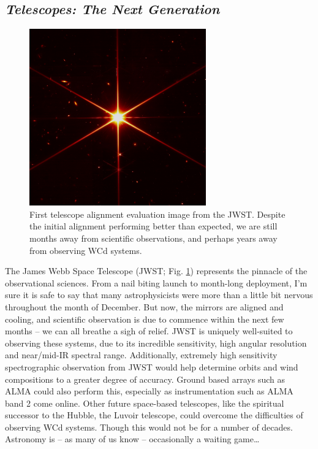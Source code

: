 \subsection{\emph{Telescopes: The Next Generation}}

\begin{figure}
  \centering
  \includegraphics[width=3in]{assets/jwst.jpg}
  \caption[First telescope alignment evaluation image from the JWST]{First telescope alignment evaluation image from the JWST. Despite the initial alignment performing better than expected, we are still months away from scientific observations, and perhaps years away from observing WCd systems.}
  \label{fig:jwst}
\end{figure}

The James Webb Space Telescope (JWST; Fig. \ref{fig:jwst}) represents the pinnacle of the observational sciences.
From a nail biting launch to month-long deployment, I'm sure it is safe to say that many astrophysicists were more than a little bit nervous throughout the month of December.
But now, the mirrors are aligned and cooling, and scientific observation is due to commence within the next few months -- we can all breathe a sigh of relief.
JWST is uniquely well-suited to observing these systems, due to its incredible sensitivity, high angular resolution and near/mid-IR spectral range.
Additionally, extremely high sensitivity spectrographic observation from JWST would help determine orbits and wind compositions to a greater degree of accuracy.
Ground based arrays such as ALMA could also perform this, especially as instrumentation such as ALMA band 2 come online.
Other future space-based telescopes, like the spiritual successor to the Hubble, the Luvoir telescope, could overcome the difficulties of observing WCd systems.
Though this would not be for a number of decades.
Astronomy is -- as many of us know -- occasionally a waiting game\ldots


